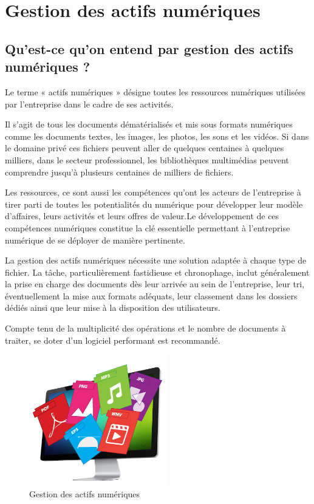 \section{Gestion des actifs numériques }

\subsection{Qu’est-ce qu’on entend par gestion des actifs numériques ?}


Le terme « actifs numériques » désigne toutes les ressources numériques utilisées par l’entreprise dans le cadre de ses activités.
\newline

Il s’agit de tous les documents dématérialisés et mis sous formats numériques comme les documents textes, les images, les photos, les sons et les vidéos.
Si dans le domaine privé ces fichiers peuvent aller de quelques centaines à quelques milliers, dans le secteur professionnel, les bibliothèques multimédias peuvent comprendre jusqu’à plusieurs centaines de milliers de fichiers.
\newline

Les ressources, ce sont aussi les compétences qu’ont les acteurs de l’entreprise à tirer parti de toutes les potentialités du numérique pour développer leur modèle d’affaires, leurs activités et leurs offres de valeur.Le    développement    de    ces    compétences numériques  constitue  la  clé  essentielle  permettant  à l’entreprise numérique de se déployer de manière pertinente.
\newline

La gestion des actifs numériques nécessite une solution adaptée à chaque type de fichier. La tâche, particulièrement fastidieuse et chronophage, inclut généralement la prise en charge des documents dès leur arrivée au sein de l’entreprise, leur tri, éventuellement la mise aux formats adéquats, leur classement dans les dossiers dédiés ainsi que leur mise à la disposition des utilisateurs.
\newline

Compte tenu de la multiplicité des opérations et le nombre de documents à traiter, se doter d’un logiciel performant est recommandé.
\newline
\begin{figure}[!!ht]
  \centering
   \includegraphics[width=6cm]{introduction/de.png}
  \caption{Gestion des actifs numériques}
  \label{fig:test1}
\end{figure}
 
